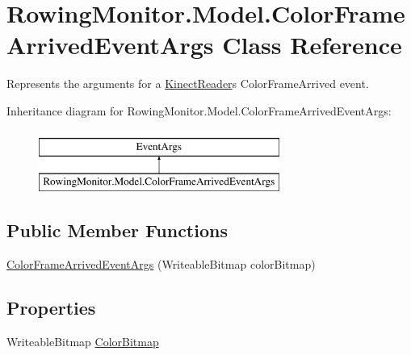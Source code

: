 \hypertarget{class_rowing_monitor_1_1_model_1_1_color_frame_arrived_event_args}{}\section{Rowing\+Monitor.\+Model.\+Color\+Frame\+Arrived\+Event\+Args Class Reference}
\label{class_rowing_monitor_1_1_model_1_1_color_frame_arrived_event_args}


Represents the arguments for a \hyperlink{class_rowing_monitor_1_1_model_1_1_kinect_reader}{Kinect\+Reader}\textquotesingle{}s Color\+Frame\+Arrived event.  


Inheritance diagram for Rowing\+Monitor.\+Model.\+Color\+Frame\+Arrived\+Event\+Args\+:\begin{figure}[H]
\begin{center}
\leavevmode
\includegraphics[height=2.000000cm]{class_rowing_monitor_1_1_model_1_1_color_frame_arrived_event_args}
\end{center}
\end{figure}
\subsection*{Public Member Functions}
\begin{DoxyCompactItemize}
\item 
\hyperlink{class_rowing_monitor_1_1_model_1_1_color_frame_arrived_event_args_a228785b0fda3657a17d7c30fd429ba1c}{Color\+Frame\+Arrived\+Event\+Args} (Writeable\+Bitmap color\+Bitmap)
\end{DoxyCompactItemize}
\subsection*{Properties}
\begin{DoxyCompactItemize}
\item 
Writeable\+Bitmap \hyperlink{class_rowing_monitor_1_1_model_1_1_color_frame_arrived_event_args_a2332327334320a56103d13596128a841}{Color\+Bitmap}
\end{DoxyCompactItemize}



